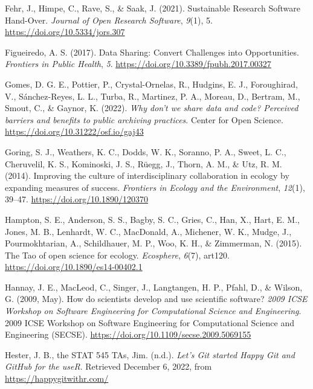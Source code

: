 \begin{CSLReferences}{1}{0}
\leavevmode{}%
Fehr, J., Himpe, C., Rave, S., \& Saak, J. (2021). Sustainable Research Software Hand-Over. \emph{Journal of Open Research Software}, \emph{9}(1), 5. \url{https://doi.org/10.5334/jors.307}

\leavevmode{}%
Figueiredo, A. S. (2017). Data Sharing: Convert Challenges into Opportunities. \emph{Frontiers in Public Health}, \emph{5}. \url{https://doi.org/10.3389/fpubh.2017.00327}

\leavevmode{}%
Gomes, D. G. E., Pottier, P., Crystal-Ornelas, R., Hudgins, E. J., Foroughirad, V., Sánchez-Reyes, L. L., Turba, R., Martinez, P. A., Moreau, D., Bertram, M., Smout, C., \& Gaynor, K. (2022). \emph{Why don't we share data and code? Perceived barriers and benefits to public archiving practices}. Center for Open Science. \url{https://doi.org/10.31222/osf.io/gaj43}

\leavevmode{}%
Goring, S. J., Weathers, K. C., Dodds, W. K., Soranno, P. A., Sweet, L. C., Cheruvelil, K. S., Kominoski, J. S., Rüegg, J., Thorn, A. M., \& Utz, R. M. (2014). Improving the culture of interdisciplinary collaboration in ecology by expanding measures of success. \emph{Frontiers in Ecology and the Environment}, \emph{12}(1), 39--47. \url{https://doi.org/10.1890/120370}

\leavevmode{}%
Hampton, S. E., Anderson, S. S., Bagby, S. C., Gries, C., Han, X., Hart, E. M., Jones, M. B., Lenhardt, W. C., MacDonald, A., Michener, W. K., Mudge, J., Pourmokhtarian, A., Schildhauer, M. P., Woo, K. H., \& Zimmerman, N. (2015). The Tao of open science for ecology. \emph{Ecosphere}, \emph{6}(7), art120. \url{https://doi.org/10.1890/es14-00402.1}

\leavevmode{}%
Hannay, J. E., MacLeod, C., Singer, J., Langtangen, H. P., Pfahl, D., \& Wilson, G. (2009, May). How do scientists develop and use scientific software? \emph{2009 ICSE Workshop on Software Engineering for Computational Science and Engineering}. 2009 ICSE Workshop on Software Engineering for Computational Science and Engineering (SECSE). \url{https://doi.org/10.1109/secse.2009.5069155}

\leavevmode{}%
Hester, J. B., the STAT 545 TAs, Jim. (n.d.). \emph{Let's Git started \textbar{} Happy Git and GitHub for the useR}. Retrieved December 6, 2022, from \url{https://happygitwithr.com/}


\end{CSLReferences}
